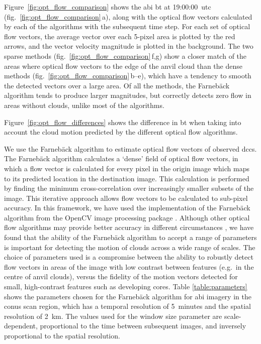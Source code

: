 Figure~\ref{fig:opt_flow_comparison} shows the \acrshort{abi} \acrshort{bt} at 19:00:00~\acrshort{utc} (fig.~\ref{fig:opt_flow_comparison}\,a), along with the optical flow vectors calculated by each of the algorithms with the subsequent time step.
For each set of optical flow vectors, the average vector over each 5-pixel area is plotted by the red arrows, and the vector velocity magnitude is plotted in the background.
The two sparse methods (fig.~\ref{fig:opt_flow_comparison}\,f,g) show a closer match of the areas where optical flow vectors to the edge of the anvil cloud than the dense methods (fig.~\ref{fig:opt_flow_comparison}\,b--e), which have a tendency to smooth the detected vectors over a large area.
Of all the methods, the Farnebäck algorithm tends to produce larger magnitudes, but correctly detects zero flow in areas without clouds, unlike most of the algorithms.

Figure~\ref{fig:opt_flow_differences} shows the difference in \acrshort{bt} when taking into account the cloud motion predicted by the different optical flow algorithms.



We use the Farnebäck algorithm \citep{farneback_two-frame_2003} to estimate optical flow vectors of observed \acrshort{dcc}s.
The Farnebäck algorithm calculates a `dense' field of optical flow vectors, in which a flow vector is calculated for every pixel in the origin image which maps to its predicted location in the destination image.
This calculation is performed by finding the minimum cross-correlation over increasingly smaller subsets of the image.
This iterative approach allows flow vectors to be calculated to sub-pixel accuracy.
In this framework, we have used the implementation of the Farnebäck algorithm from the OpenCV image processing package \citep{opencv_library}.
Although other optical flow algorithms may provide better accuracy in different circumstances \citep{baker_database_2011}, we have found that the ability of the Farnebäck algorithm to accept a range of parameters is important for detecting the motion of clouds across a wide range of scales.
The choice of parameters used is a compromise between the ability to robustly detect flow vectors in areas of the image with low contrast between features (e.g.\ in the centre of anvil clouds), versus the fidelity of the motion vectors detected for small, high-contrast features such as developing cores.
Table \ref{table:parameters} shows the parameters chosen for the Farnebäck algorithm for \acrshort{abi} imagery in the \acrshort{conus} scan region, which has a temporal resolution of 5~minutes and the spatial resolution of 2~km.
The values used for the window size parameter are scale-dependent, proportional to the time between subsequent images, and inversely proportional to the spatial resolution.


